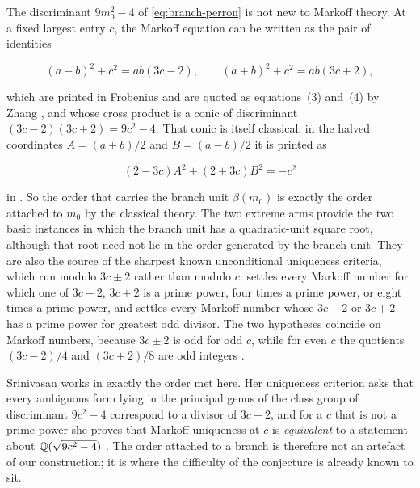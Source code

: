 \begin{remark}
\label{rem:frobenius-conic}
The discriminant $9m_0^2-4$ of \cref{eq:branch-perron} is not new to Markoff
theory. At a fixed largest entry $c$, the Markoff equation can be written as
the pair of identities

\begin{equation}
 (a-b)^2+c^2=ab(3c-2),
 \qquad
 (a+b)^2+c^2=ab(3c+2),
 \label{eq:frobenius-identities}
\end{equation}

which are printed in Frobenius \cite[p.~601 of the reprint]{Frobenius1913}
and are quoted as equations~(3) and~(4) by Zhang \cite{Zhang2007}, and whose
cross product is a conic of discriminant $(3c-2)(3c+2)=9c^2-4$. That conic is
itself classical: in the halved coordinates $A=(a+b)/2$ and $B=(a-b)/2$ it is
printed as

\begin{equation}
 (2-3c)A^2+(2+3c)B^2=-c^2
 \label{eq:srinivasan-conic}
\end{equation}

in \cite[eq.~(2.3)]{Srinivasan2009}. So the
order that carries the branch unit $\beta(m_0)$ is exactly the order attached
to $m_0$ by the classical theory. The two extreme arms provide the two basic
instances in which the branch unit has a quadratic-unit square root, although
that root need not lie in the order generated by the branch unit. They are
also the source of the sharpest known unconditional
uniqueness criteria, which run modulo $3c\pm2$ rather than modulo $c$:
\cite[Theorem~2]{Zhang2007} settles every Markoff number for which one of
$3c-2$, $3c+2$ is a prime power, four times a prime power, or eight times a
prime power, and \cite[Theorem~2.3]{Srinivasan2009} settles every Markoff
number whose $3c-2$ or $3c+2$ has a prime power for greatest odd divisor. The
two hypotheses coincide on Markoff numbers, because $3c\pm2$ is odd for odd
$c$, while for even $c$ the quotients $(3c-2)/4$ and $(3c+2)/8$ are odd
integers \cite[Lemma~4.2]{Srinivasan2009}.

Srinivasan works in exactly the order met here. Her uniqueness criterion
\cite[Theorem~5.4]{Srinivasan2009} asks that every ambiguous form lying in the
principal genus of the class group of discriminant $9c^2-4$ correspond to a
divisor of $3c-2$, and for a $c$ that is not a prime power she proves that
Markoff uniqueness at $c$ is \emph{equivalent} to a statement about
$\mathbb{Q}(\sqrt{9c^2-4})$ \cite[Theorem~5.3]{Srinivasan2009}. The order attached to
a branch is therefore not an artefact of our construction; it is where the
difficulty of the conjecture is already known to sit.


\end{remark}
